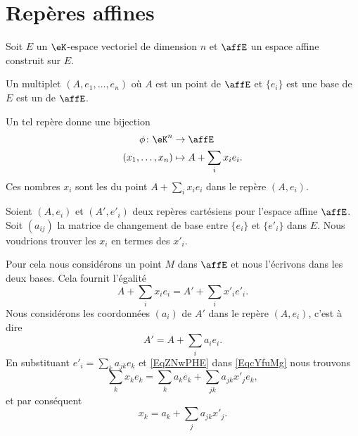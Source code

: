 \section{Repères affines}

Soit \( E\) un \( \eK\)-espace vectoriel de dimension \( n\) et \( \affE\) un espace affine construit sur \( E\).
\begin{definition}      \label{DEFooQELZooEXvxgw}
    Un multiplet \( (A,e_1,\ldots, e_n)\) où \( A\) est un point de \( \affE\) et \( \{ e_i \}\) est une base de \( E\) est un  de \( \affE\).
\end{definition}
Un tel repère donne une bijection
\begin{equation}
    \begin{aligned}
        \phi\colon \eK^n&\to \affE \\
        (x_1,\ldots, x_n)&\mapsto A+\sum_ix_ie_i. 
    \end{aligned}
\end{equation}
Ces nombres \( x_i\) sont les  du point \( A+\sum_ix_ie_i\) dans le repère \( (A,e_i)\).

Soient \( (A,e_i)\) et \( (A',e'_i)\) deux repères cartésiens pour l'espace affine \( \affE\). Soit \( (a_{ij})\) la matrice de changement de base entre \( \{ e_i \}\) et \( \{ e'_i \}\) dans \( E\). Nous voudrions trouver les \( x_i\) en termes des \( x'_i\).

Pour cela nous considérons un point \( M\) dans \( \affE\) et nous l'écrivons dans les deux bases. Cela fournit l'égalité
\begin{equation}        \label{EqcYfuMg}
    A+\sum_ix_ie_i=A'+\sum_ix'_ie'_i.
\end{equation}
Nous considérons les coordonnées \( (a_i)\) de \( A'\) dans le repère \( (A,e_i)\), c'est à dire
\begin{equation}    \label{EqZNwPHE}
    A'=A+\sum_ia_ie_i.
\end{equation}
En substituant \( e'_i=\sum_ka_{jk}e_k\) et \eqref{EqZNwPHE} dans \eqref{EqcYfuMg} nous trouvons
\begin{equation}
    \sum_kx_ke_k=\sum_ka_ke_k+\sum_{jk}a_{jk}x'_je_k,
\end{equation}
et par conséquent
\begin{equation}
    x_k=a_k+\sum_ja_{jk}x'_j.
\end{equation}

